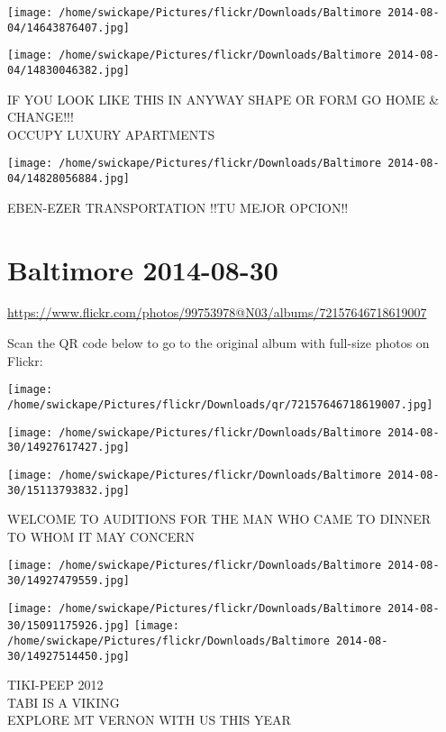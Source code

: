 \documentclass[10pt,letterpaper]{article}
\begin{document}
\texttt{[image: /home/swickape/Pictures/flickr/Downloads/Baltimore 2014-08-04/14643876407.jpg]}

\vspace{0.25in}
\texttt{[image: /home/swickape/Pictures/flickr/Downloads/Baltimore 2014-08-04/14830046382.jpg]}

IF YOU LOOK LIKE THIS IN ANYWAY SHAPE OR FORM GO HOME \& CHANGE!!!\\
OCCUPY LUXURY APARTMENTS
\pagebreak

\texttt{[image: /home/swickape/Pictures/flickr/Downloads/Baltimore 2014-08-04/14828056884.jpg]}

EBEN{-}EZER TRANSPORTATION  !!TU MEJOR OPCION!!
\pagebreak

\section*{Baltimore 2014-08-30}

\url{https://www.flickr.com/photos/99753978@N03/albums/72157646718619007}

Scan the QR code below to go to the original album with full-size photos on Flickr:

\texttt{[image: /home/swickape/Pictures/flickr/Downloads/qr/72157646718619007.jpg]}
\pagebreak

\texttt{[image: /home/swickape/Pictures/flickr/Downloads/Baltimore 2014-08-30/14927617427.jpg]}

\vspace{0.25in}
\texttt{[image: /home/swickape/Pictures/flickr/Downloads/Baltimore 2014-08-30/15113793832.jpg]}

WELCOME TO AUDITIONS FOR THE MAN WHO CAME TO DINNER\\
TO WHOM IT MAY CONCERN
\pagebreak

\texttt{[image: /home/swickape/Pictures/flickr/Downloads/Baltimore 2014-08-30/14927479559.jpg]}

\vspace{0.25in}
\texttt{[image: /home/swickape/Pictures/flickr/Downloads/Baltimore 2014-08-30/15091175926.jpg]}
\texttt{[image: /home/swickape/Pictures/flickr/Downloads/Baltimore 2014-08-30/14927514450.jpg]}

TIKI{-}PEEP 2012\\
TABI IS A VIKING\\
EXPLORE MT VERNON WITH US THIS YEAR
\pagebreak
\end{document}
